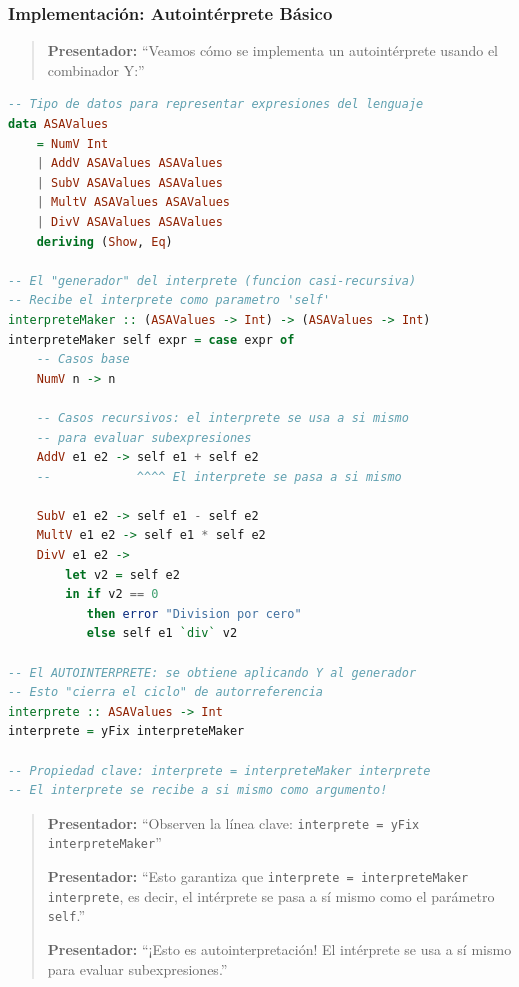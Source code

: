 \documentclass[12pt]{article}
\begin{document}
\subsubsection*{Implementación: Autointérprete Básico}

\begin{quote}
\textbf{Presentador:} ``Veamos cómo se implementa un autointérprete usando el combinador Y:''
\end{quote}

\begin{lstlisting}[language=Haskell, caption=Autointérprete con Combinador Y]
-- Tipo de datos para representar expresiones del lenguaje
data ASAValues
    = NumV Int
    | AddV ASAValues ASAValues
    | SubV ASAValues ASAValues
    | MultV ASAValues ASAValues
    | DivV ASAValues ASAValues
    deriving (Show, Eq)

-- El "generador" del interprete (funcion casi-recursiva)
-- Recibe el interprete como parametro 'self'
interpreteMaker :: (ASAValues -> Int) -> (ASAValues -> Int)
interpreteMaker self expr = case expr of
    -- Casos base
    NumV n -> n

    -- Casos recursivos: el interprete se usa a si mismo
    -- para evaluar subexpresiones
    AddV e1 e2 -> self e1 + self e2
    --            ^^^^ El interprete se pasa a si mismo

    SubV e1 e2 -> self e1 - self e2
    MultV e1 e2 -> self e1 * self e2
    DivV e1 e2 ->
        let v2 = self e2
        in if v2 == 0
           then error "Division por cero"
           else self e1 `div` v2

-- El AUTOINTERPRETE: se obtiene aplicando Y al generador
-- Esto "cierra el ciclo" de autorreferencia
interprete :: ASAValues -> Int
interprete = yFix interpreteMaker

-- Propiedad clave: interprete = interpreteMaker interprete
-- El interprete se recibe a si mismo como argumento!
\end{lstlisting}

\begin{quote}
\textbf{Presentador:} ``Observen la línea clave: \texttt{interprete = yFix interpreteMaker}''

\textbf{Presentador:} ``Esto garantiza que \texttt{interprete = interpreteMaker interprete}, es decir, el intérprete se pasa a sí mismo como el parámetro \texttt{self}.''

\textbf{Presentador:} ``¡Esto es autointerpretación! El intérprete se usa a sí mismo para evaluar subexpresiones.''
\end{quote}
\end{document}
